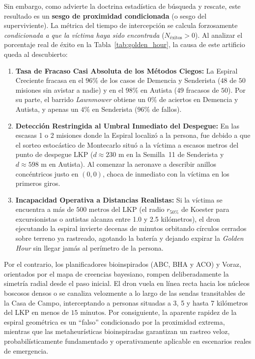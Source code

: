 Sin embargo, como advierte la doctrina estadística de búsqueda y rescate, este resultado es un \textbf{sesgo de proximidad condicionada} (o sesgo del superviviente). La métrica del tiempo de intercepción se calcula forzosamente \textit{condicionada a que la víctima haya sido encontrada} ($N_{\text{éxitos}} > 0$). Al analizar el porcentaje real de éxito en la Tabla~\ref{tab:golden_hour}, la causa de este artificio queda al descubierto:
\begin{enumerate}
    \item \textbf{Tasa de Fracaso Casi Absoluta de los Métodos Ciegos:} La Espiral Creciente fracasa en el $96\%$ de los casos de Demencia y Senderista ($48$ de $50$ misiones sin avistar a nadie) y en el $98\%$ en Autista ($49$ fracasos de $50$). Por su parte, el barrido \textit{Lawnmower} obtiene un $0\%$ de aciertos en Demencia y Autista, y apenas un $4\%$ en Senderista ($96\%$ de fallos).
    \item \textbf{Detección Restringida al Umbral Inmediato del Despegue:} En las escasas 1 o 2 misiones donde la Espiral localizó a la persona, fue debido a que el sorteo estocástico de Montecarlo situó a la víctima a escasos metros del punto de despegue LKP ($d \approx 230\text{ m}$ en la Semilla~11 de Senderista y $d \approx 598\text{ m}$ en Autista). Al comenzar la aeronave a describir anillos concéntricos justo en $(0,0)$, choca de inmediato con la víctima en los primeros giros.
    \item \textbf{Incapacidad Operativa a Distancias Realistas:} Si la víctima se encuentra a más de $500\text{ metros}$ del LKP (el radio $r_{50\%}$ de Koester para excursionistas o autistas alcanza entre 1.0 y 2.5 kilómetros), el dron ejecutando la espiral invierte decenas de minutos orbitando círculos cerrados sobre terreno ya rastreado, agotando la batería y dejando expirar la \textit{Golden Hour} sin llegar jamás al perímetro de la persona.
\end{enumerate}

Por el contrario, los planificadores bioinspirados (ABC, BHA y ACO) y Voraz, orientados por el mapa de creencias bayesiano, rompen deliberadamente la simetría radial desde el paso inicial. El dron vuela en línea recta hacia los núcleos boscosos densos o se canaliza velozmente a lo largo de las sendas transitables de la Casa de Campo, interceptando a personas situadas a 3, 5 y hasta 7 kilómetros del LKP en menos de $15\text{ minutos}$. Por consiguiente, la aparente rapidez de la espiral geométrica es un ``falso'' condicionado por la proximidad extrema, mientras que las metaheurísticas bioinspiradas garantizan un rastreo veloz, probabilísticamente fundamentado y operativamente aplicable en escenarios reales de emergencia.
